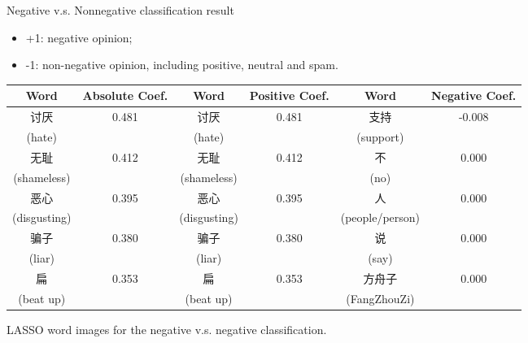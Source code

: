 \documentclass[12pt, trans]{beamer}
\newcommand{\1}[1]{{\mathbf 1}\left\{#1\right\}}        %
\begin{document}
\begin{frame}{Negative v.s. Nonnegative classification result}
\begin{itemize}[<+->]
\item +1: negative opinion;
\item -1: non-negative opinion, including positive, neutral and spam.
\end{itemize}

\tiny
\begin{center}
\begin{tabular}{|c|c||c|c||c|c|}
\hline
Word & Absolute Coef. & Word & Positive Coef. & Word & Negative Coef.\\ \hline \hline
讨厌 & 0.481 & 讨厌 & 0.481 & 支持 & -0.008\\
(hate) & & (hate) & & (support) & \\\hline
无耻 & 0.412 & 无耻 & 0.412 & 不 & 0.000\\
(shameless) & & (shameless) & & (no) & \\\hline
恶心 & 0.395 & 恶心 & 0.395 & 人 & 0.000\\
(disgusting) & & (disgusting) & & (people/person) & \\\hline
骗子 & 0.380 & 骗子 & 0.380 & 说 & 0.000\\
(liar) & & (liar) & & (say) & \\\hline
扁 & 0.353 & 扁 & 0.353 & 方舟子 & 0.000\\
(beat up) & & (beat up) & & (FangZhouZi) & \\\hline
\end{tabular}
LASSO word images for the negative v.s. negative classification.
\end{center}

\end{frame}


\end{document}
